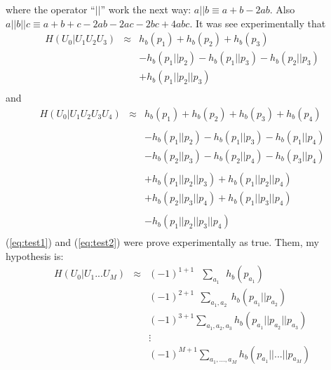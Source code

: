 \documentclass[a4paper,10pt]{article}
\begin{document}
where the operator ``$||$'' work the next way:
$a||b \equiv a+b-2ab$. Also $a||b||c \equiv a+b+c-2ab-2ac-2bc+4abc$.
It was see experimentally that
\begin{equation}\label{eq:test1}
\begin{matrix}
H(U_0|U_1 U_2 U_3) & \approx & h_b(p_1) + h_b(p_2) + h_b(p_3) \\
~                  & ~       & - h_b(p_1||p_2)- h_b(p_1||p_3) - h_b(p_2||p_3)\\
~                  & ~       & + h_b(p_1||p_2||p_3)\\
\end{matrix}
\end{equation}
and
\begin{equation}\label{eq:test2}
\begin{matrix}
H(U_0|U_1 U_2 U_3 U_4) & \approx & h_b(p_1) + h_b(p_2) + h_b(p_3) + h_b(p_4)\\
~                      & ~       & ~\\
~                      & ~       & - h_b(p_1||p_2)- h_b(p_1||p_3) - h_b(p_1||p_4)\\
~                      & ~       & - h_b(p_2||p_3)- h_b(p_2||p_4) - h_b(p_3||p_4)\\
~                      & ~       & ~\\
~                      & ~       & + h_b(p_1||p_2||p_3)+ h_b(p_1||p_2||p_4)\\
~                      & ~       & + h_b(p_2||p_3||p_4)+ h_b(p_1||p_3||p_4)\\
~                      & ~       & ~\\
~                      & ~       & - h_b(p_1||p_2||p_3||p_4)\\
\end{matrix}
\end{equation}
(\ref{eq:test1}) and (\ref{eq:test2}) were prove experimentally as true.
Them, my  hypothesis is:
\begin{equation}
\begin{matrix}
H(U_0|U_1 ... U_M) & \approx & (-1)^{1+1}~~~\sum \limits_{a_1}        ~~h_b(p_{a_1})~~~~~~~~~~~~~\\
~                  & ~       & (-1)^{2+1}~~\sum \limits_{a_1,a_2}    ~h_b(p_{a_1}||p_{a_2})~~~~~~~\\
~                  & ~       & (-1)^{3+1}\sum \limits_{a_1,a_2,a_3} h_b(p_{a_1}||p_{a_2}||p_{a_3})\\
~                  & ~       & \vdots\\
~                  & ~       & (-1)^{M+1}\sum \limits_{a_1, ...,a_M} h_b(p_{a_1}||...||p_{a_M})\\


\end{matrix}
\end{equation}
\end{document}
